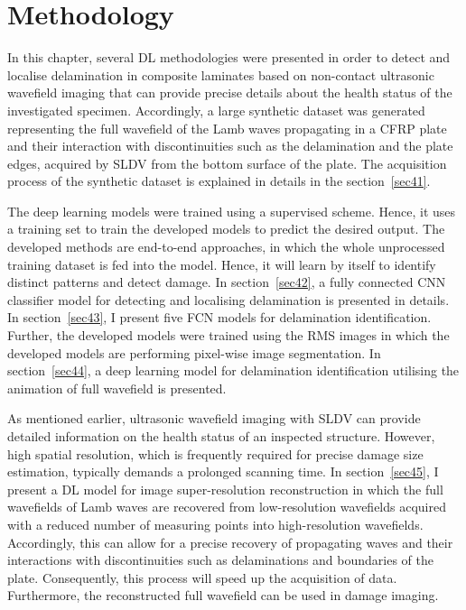 \chapter[Methodology]{Methodology}
\label{ch4}

In this chapter, several DL methodologies were presented in order to detect and localise delamination in composite laminates based on non-contact ultrasonic wavefield imaging that can provide precise details about the health status of the investigated specimen.
Accordingly, a large synthetic dataset was generated representing the full wavefield of the Lamb waves propagating in a CFRP plate and their interaction with discontinuities such as the delamination and the plate edges, acquired by SLDV from the bottom surface of the plate.
The acquisition process of the synthetic dataset is explained in details in the section~\ref{sec41}.

The deep learning models were trained using a supervised scheme. 
Hence, it uses a training set to train the developed models to predict the desired output.
The developed methods are end-to-end approaches, in which the whole unprocessed training dataset is fed into the model.
Hence, it will learn by itself to identify distinct patterns and detect damage.
In section~\ref{sec42}, a fully connected CNN classifier model for detecting and localising delamination is presented in details.
In section~\ref{sec43}, I present five FCN models for delamination identification. 
Further, the developed models were trained using the RMS images in which the developed models are performing pixel-wise image segmentation.
In section~\ref{sec44}, a deep learning model for delamination identification utilising the animation of full wavefield is presented.

As mentioned earlier, ultrasonic wavefield imaging with SLDV can provide detailed information on the health status of an inspected structure.
However, high spatial resolution, which is frequently required for precise damage size estimation, typically demands a prolonged scanning time.
In section~\ref{sec45}, I present a DL model for image super-resolution reconstruction in which the full wavefields of Lamb waves are recovered from low-resolution wavefields acquired with a reduced number of measuring points into high-resolution wavefields.
Accordingly, this can allow for a precise recovery of propagating waves and their interactions with discontinuities such as delaminations and boundaries of the plate.
Consequently, this process will speed up the acquisition of data.
Furthermore, the reconstructed full wavefield can be used in damage imaging. 


